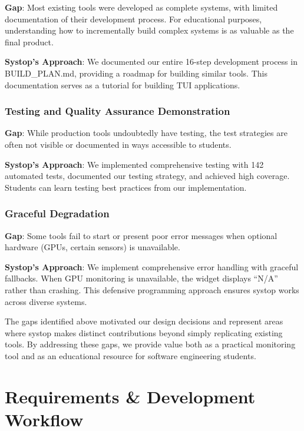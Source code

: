\documentclass[12pt,a4paper,oneside]{report}
\begin{document}
\textbf{Gap}: Most existing tools were developed as complete systems, with limited documentation of their development process. For educational purposes, understanding how to incrementally build complex systems is as valuable as the final product.

\textbf{Systop's Approach}: We documented our entire 16-step development process in BUILD\_PLAN.md, providing a roadmap for building similar tools. This documentation serves as a tutorial for building TUI applications.

\subsection{Testing and Quality Assurance Demonstration}

\textbf{Gap}: While production tools undoubtedly have testing, the test strategies are often not visible or documented in ways accessible to students.

\textbf{Systop's Approach}: We implemented comprehensive testing with 142 automated tests, documented our testing strategy, and achieved high coverage. Students can learn testing best practices from our implementation.

\subsection{Graceful Degradation}

\textbf{Gap}: Some tools fail to start or present poor error messages when optional hardware (GPUs, certain sensors) is unavailable.

\textbf{Systop's Approach}: We implement comprehensive error handling with graceful fallbacks. When GPU monitoring is unavailable, the widget displays ``N/A'' rather than crashing. This defensive programming approach ensures systop works across diverse systems.

The gaps identified above motivated our design decisions and represent areas where systop makes distinct contributions beyond simply replicating existing tools. By addressing these gaps, we provide value both as a practical monitoring tool and as an educational resource for software engineering students.

\chapter{Requirements \& Development Workflow}
\label{chap:requirements}
\end{document}
